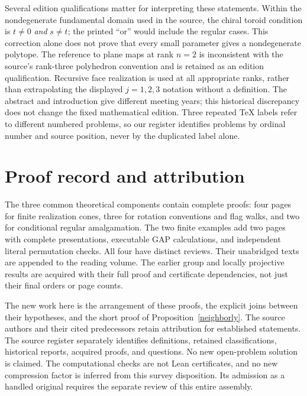 \documentclass[11pt,a4paper]{article}
\begin{document}



Several edition qualifications matter for interpreting
these statements. Within the nondegenerate fundamental
domain used in the source, the chiral toroid condition is
$t\ne0$ \emph{and} $s\ne t$; the printed ``or'' would
include the regular cases. This correction alone does not
prove that every small parameter gives a nondegenerate
polytope. The reference to plane maps at rank $n=2$ is
inconsistent with the source's rank-three polyhedron
convention and is retained as an edition qualification.
Recursive face realization is used at all appropriate
ranks, rather than extrapolating the displayed $j=1,2,3$
notation without a definition. The abstract and
introduction give different meeting years; this historical
discrepancy does not change the fixed mathematical edition.
Three repeated TeX labels refer to different numbered
problems, so our register identifies problems by ordinal
number and source position, never by the duplicated label
alone.

\section{Proof record and attribution}

The three common theoretical components contain complete
proofs: four pages for finite realization cones, three
for rotation conventions and flag walks, and two for
conditional regular amalgamation. The two finite examples
add two pages with complete presentations, executable GAP
calculations, and independent literal permutation checks.
All four have distinct reviews. Their unabridged texts
are appended to the reading volume. The earlier group and
locally projective results are acquired with their full
proof and certificate dependencies, not just their final
orders or page counts.

The new work here is the arrangement of these proofs,
the explicit joins between their hypotheses, and the
short proof of Proposition~\ref{neighborly}. The source
authors and their cited predecessors retain attribution
for established statements. The source register separately
identifies definitions, retained classifications,
historical reports, acquired proofs, and questions.
No new open-problem solution is claimed. The computational
checks are not Lean certificates, and no new compression
factor is inferred from this survey disposition. Its
admission as a handled original requires the separate
review of this entire assembly.
\end{document}
